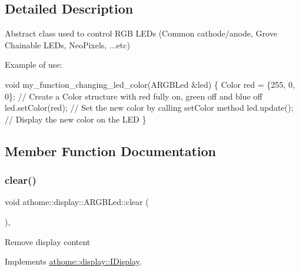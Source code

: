 \subsection{Detailed Description}
Abstract class used to control R\+GB L\+E\+Ds (Common cathode/anode, Grove Chainable L\+E\+Ds, Neo\+Pixels, ...etc)

Example of use\+:


\begin{DoxyCode}
\textcolor{keywordtype}{void} my\_function\_changing\_led\_color(ARGBLed &led) \{
  Color red = \{255, 0, 0\}; \textcolor{comment}{// Create a Color structure with red fully on, green off and blue off}
  led.setColor(red); \textcolor{comment}{// Set the new color by calling setColor method}
  led.update(); \textcolor{comment}{// Display the new color on the LED}
\}
\end{DoxyCode}
 

\subsection{Member Function Documentation}
\mbox{\label{classathome_1_1display_1_1_a_r_g_b_led_a9753e3a23ea5cb6b0a41079bc6128766}} 
\subsubsection{\texorpdfstring{clear()}{clear()}}
{\footnotesize\ttfamily void athome\+::display\+::\+A\+R\+G\+B\+Led\+::clear (\begin{DoxyParamCaption}{ }\end{DoxyParamCaption})\hspace{0.3cm}{\ttfamily [inline]}, {\ttfamily [virtual]}}

Remove display content 

Implements \mbox{\hyperlink{classathome_1_1display_1_1_i_display_a0d3add1ce61c96657827fb56d250d9c6}{athome\+::display\+::\+I\+Display}}.

\mbox{\label{classathome_1_1display_1_1_a_r_g_b_led_a2c3022a5aad43595fefc4b52d916467a}} 

